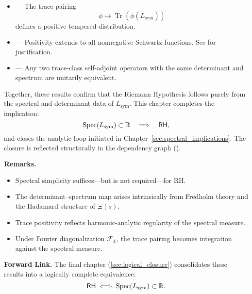 \begin{itemize}
  \item {} — The trace pairing
  \[
  \phi \mapsto \operatorname{Tr}(\phi(L_{\mathrm{sym}}))
  \]
  defines a positive tempered distribution.

  \item {} — Positivity extends to all nonnegative Schwartz functions. See  for justification.

  \item {} — Any two trace-class self-adjoint operators with the same determinant and spectrum are unitarily equivalent.
\end{itemize}

Together, these results confirm that the Riemann Hypothesis follows purely from the spectral and determinant data of \( L_{\mathrm{sym}} \). This chapter completes the implication:
\[
\operatorname{Spec}(L_{\mathrm{sym}}) \subset \mathbb{R} \quad \Longrightarrow \quad \mathsf{RH},
\]
and closes the analytic loop initiated in Chapter~\ref{sec:spectral_implications}. The closure is reflected structurally in the dependency graph ().

\medskip

\noindent
\textbf{Remarks.}
\begin{itemize}
  \item Spectral simplicity suffices—but is not required—for RH.
  \item The determinant–spectrum map arises intrinsically from Fredholm theory and the Hadamard structure of \( \Xi(s) \).
  \item Trace positivity reflects harmonic-analytic regularity of the spectral measure.
  \item Under Fourier diagonalization \( \mathcal{F}_L \), the trace pairing becomes integration against the spectral measure.
\end{itemize}

\medskip

\noindent
\textbf{Forward Link.}  
The final chapter (\cref{sec:logical_closure}) consolidates these results into a logically complete equivalence:
\[
\mathsf{RH} \iff \operatorname{Spec}(L_{\mathrm{sym}}) \subset \mathbb{R}.
\]
